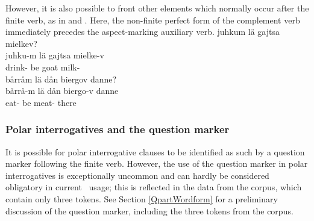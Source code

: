 However, it is also possible to front other elements which normally occur after the finite verb, as in  and . Here, the non-finite perfect form of the complement verb immediately precedes the aspect-marking auxiliary verb.
\ea\label{polarQinversion5}%
\glll	juhkum lä gajtsa mielkev?\\
	juhku-m lä gajtsa mielke-v\\
	drink- be\BS{} goat\BS{} milk-\\\nopagebreak
{} 
\z
\ea\label{polarQinversion6}
\glll	bårråm lä dån biergov danne?\\
	bårrå-m lä dån biergo-v danne\\
	eat- be\BS{}  meat- there\\\nopagebreak
{} 
\z


\subsubsection{Polar interrogatives and the question marker}\label{Qparticle}
It is possible for polar interrogative clauses to be identified as such by a question marker \TILDE{} following the finite verb. However, the use of the question marker in polar interrogatives is exceptionally uncommon and can hardly be considered obligatory in current \PS\ usage; this is reflected in the data from the corpus, which contain only three tokens. See Section \ref{QpartWordform} for a preliminary discussion of the question marker, including the three tokens from the corpus. %


